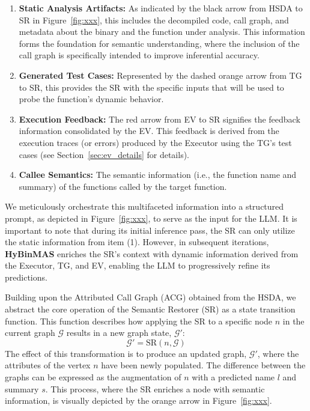 \documentclass[acmsmall,screen,review,anonymous]{acmart} %
\begin{document}
\begin{enumerate}
    \item \textbf{Static Analysis Artifacts:} As indicated by the black arrow from HSDA to SR in Figure~\ref{fig:xxx}, this includes the decompiled code, call graph, and metadata about the binary and the function under analysis. This information forms the foundation for semantic understanding, where the inclusion of the call graph is specifically intended to improve inferential accuracy.
    \item \textbf{Generated Test Cases:} Represented by the dashed orange arrow from TG to SR, this provides the SR with the specific inputs that will be used to probe the function's dynamic behavior.
    \item \textbf{Execution Feedback:} The red arrow from EV to SR signifies the feedback information consolidated by the EV. This feedback is derived from the execution traces (or errors) produced by the Executor using the TG's test cases (see Section~\ref{sec:ev_details} for details).
    \item \textbf{Callee Semantics:} The semantic information (i.e., the function name and summary) of the functions called by the target function.
\end{enumerate}

We meticulously orchestrate this multifaceted information into a structured prompt, as depicted in Figure~\ref{fig:xxx}, to serve as the input for the LLM. It is important to note that during its initial inference pass, the SR can only utilize the static information from item (1). However, in subsequent iterations, \textbf{HyBinMAS} enriches the SR's context with dynamic information derived from the Executor, TG, and EV, enabling the LLM to progressively refine its predictions.

Building upon the Attributed Call Graph (ACG) obtained from the HSDA, we abstract the core operation of the Semantic Restorer (SR) as a state transition function. This function describes how applying the SR to a specific node \(n\) in the current graph \(\mathcal{G}\) results in a new graph state, \(\mathcal{G}'\):
\begin{equation}
\label{eq:sr_transition}
\mathcal{G}' = \text{SR}(n, \mathcal{G})
\end{equation}
The effect of this transformation is to produce an updated graph, \(\mathcal{G}'\), where the attributes of the vertex \(n\) have been newly populated. The difference between the graphs can be expressed as the augmentation of \(n\) with a predicted name \(l\) and summary \(s\). This process, where the SR enriches a node with semantic information, is visually depicted by the orange arrow in Figure~\ref{fig:xxx}.
\end{document}
